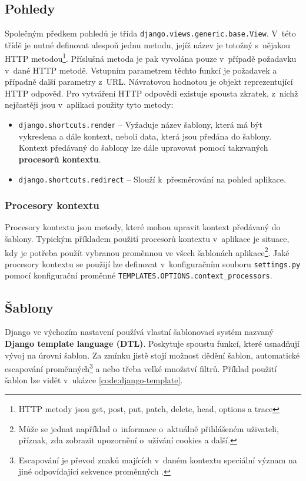 \subsection{Pohledy}
\begin{sloppypar}
Společným předkem pohledů je třída \texttt{django.views.generic.base.View}. V~této třídě je nutné definovat alespoň jednu metodu, jejíž název je totožný s~nějakou HTTP metodou\footnote{HTTP metody jsou get, post, put, patch, delete, head, options a trace}. Příslušná metoda je pak vyvolána pouze v~případě požadavku v~dané HTTP metodě. Vstupním parametrem těchto funkcí je požadavek a případně další parametry z~URL. Návratovou hodnotou je objekt reprezentující HTTP odpověď. Pro vytváření HTTP odpovědi existuje spousta zkratek, z~nichž nejčastěji jsou v~aplikaci použity tyto metody:
\begin{itemize}
    \item \texttt{django.shortcuts.render} -- Vyžaduje název šablony, která má být vykreslena a dále kontext, neboli data, která jsou předána do šablony. Kontext předávaný do šablony lze dále upravovat pomocí takzvaných \textbf{procesorů kontextu}.
    \item \texttt{django.shortcuts.redirect} -- Slouží k~přesměrování na pohled aplikace.
\end{itemize}
\end{sloppypar}

\subsubsection{Procesory kontextu}
\begin{sloppypar}
Procesory kontextu jsou metody, které mohou upravit kontext předávaný do šablony. Typickým příkladem použití procesorů kontextu v~aplikace je situace, kdy je potřeba použít vybranou proměnnou ve všech šablonách aplikace\footnote{Může se jednat například o~informace o~aktuálně přihlášeném uživateli, příznak, zda zobrazit upozornění o~užívání cookies a další.}. Jaké procesory kontextu se použijí lze definovat v~konfiguračním souboru \texttt{settings.py} pomocí konfigurační proměnné \texttt{TEMPLATES.OPTIONS.context\_processors}.
\end{sloppypar}


\subsection{Šablony}
Django ve výchozím nastavení používá vlastní šablonovací systém nazvaný \textbf{Django template language (DTL)}. Poskytuje spoustu funkcí, které usnadňují vývoj na úrovni šablon. Za zmínku jistě stojí možnost dědění šablon, automatické escapování proměnných\footnote{Escapování je převod znaků majících v~daném kontextu speciální význam na jiné odpovídající sekvence proměnných \cite{escape}.} a nebo třeba velké množství filtrů. Příklad použití šablon lze vidět v~ukázce \ref{code:django-template}.

